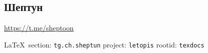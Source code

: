  
 
\subsection{Шептун}
\label{sec:tg.ch.sheptun}
\url{https://t.me/sheptoon}
  
\vspace{0.5cm}
 {\ifDEBUG\small\LaTeX~section: \verb|tg.ch.sheptun| project: \verb|letopis| rootid: \verb|texdocs|	\fi}
\vspace{0.5cm}


  
